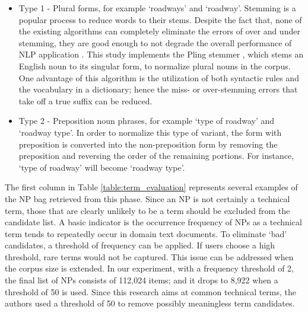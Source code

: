 \documentclass[Journal, BackFigs,NoLists, DoubleSpace]{ascelike}%
\begin{document}
\begin{enumerate} [label=\roman*]
\begin{itemize}
		\item Type 1 - Plural forms, for example `roadways' and `roadway'. Stemming is a popular process to reduce words to their stems. Despite the fact that, none of the existing algorithms can completely eliminate the errors of over and under stemming, they are good enough to not degrade the overall performance of NLP application \cite{jivani2011stemmer}. This study implements the Pling stemmer \cite{suchanek2006stemmer}, which stems an English noun to its singular form, to normalize plural nouns in the corpus. One advantage of this algorithm is the utilization of both syntactic rules and the vocabulary in a dictionary; hence the miss- or over-stemming errors that take off a true suffix can be reduced. 
		\item Type 2 - Preposition noun phrases, for example `type of roadway' and `roadway type'. In order to normalize this type of variant, the form with preposition is converted into the non-preposition form by removing the preposition and reversing the order of the remaining portions. For instance, `type of roadway' will become `roadway type'.
\end{itemize}
\end{enumerate}
%
\par
The first column in Table \ref{table:term_evaluation} represents several examples of the NP bag retrieved from this phase. Since an NP is not certainly a technical term, those that are clearly unlikely to be a term should be excluded from the candidate list. A basic indicator is the occurrence frequency of NPs as a technical term tends to repeatedly occur in domain text documents. To eliminate `bad' candidates, a threshold of frequency can be applied. If users choose a high threshold, rare terms would not be captured. This issue can be addressed when the corpus size is extended. In our experiment, with a frequency threshold of 2, the final list of NPs consists of 112,024 items; and it drops to 8,922 when a threshold of 50 is used. Since this research aims at common technical terms, the authors used a threshold of 50 to remove possibly meaningless term candidates. 
%	
\end{document}

